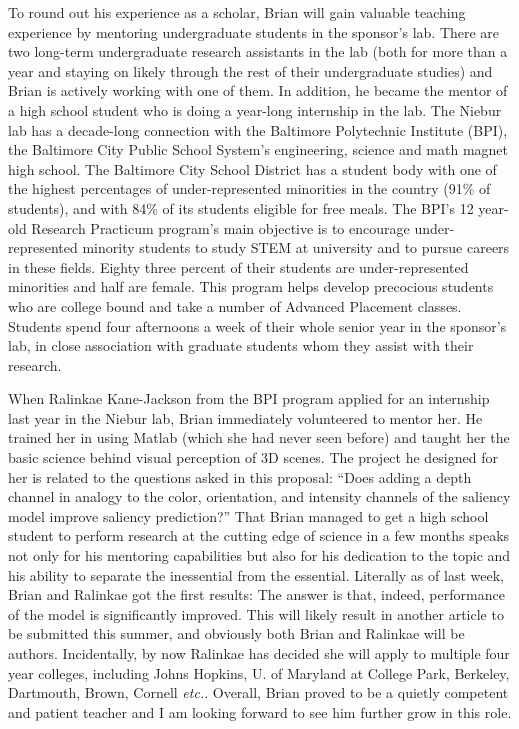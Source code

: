 \documentclass[11pt,notitlepage]{article}
\newcommand{\etc}[0]{{\em etc.}\xspace}
\begin{document}
To round out his experience as a scholar, Brian will gain
valuable teaching experience by
mentoring undergraduate
students in the sponsor's lab. There are two long-term undergraduate
research assistants in the lab (both for more than a year and staying
on likely through the rest of their undergraduate studies) and Brian
is actively working with one of them.  
In addition, he became the mentor of a high school student who is
doing a year-long internship in the lab. The Niebur lab has a
decade-long connection with the Baltimore Polytechnic Institute (BPI),
the Baltimore City Public School System's engineering, science and
math magnet high school. The Baltimore City School District has a
student body with one of the highest percentages of under-represented
minorities in the country (91\% of students), and with 84\% of its
students eligible for free meals.  The BPI's 12 year-old Research
Practicum program's main objective is to encourage under-represented
minority students to study STEM at university and to pursue careers in
these fields. Eighty three percent of their students are
under-represented minorities and half are female.  This program helps
develop precocious students who are college bound and take a number of
Advanced Placement classes.  Students spend four afternoons a week of
their whole senior year in the sponsor's lab, in close association
with graduate students whom they assist with their research.

When Ralinkae Kane-Jackson from the BPI program applied for an
internship last year in the Niebur lab, Brian immediately volunteered
to mentor her.  He trained her in using Matlab (which she had never
seen before) and taught her the basic science behind visual perception
of 3D scenes. The project he designed for her is related to the
questions asked in this proposal: ``Does adding a depth channel in
analogy to the color, orientation, and intensity channels of the
\citep{Itti_etal98a} saliency model improve saliency prediction?''
That Brian managed to get a high school student to perform research at
the cutting edge of science in a few months speaks not only for
his mentoring capabilities but also for his dedication to the topic
and his ability to separate the inessential from the
essential. Literally as of last week, Brian and Ralinkae got the first results:
The answer is that, indeed, performance of the model is significantly
improved. This will likely result in another article to be submitted
this summer, and obviously both Brian and Ralinkae will be authors. Incidentally, by now Ralinkae has decided she will apply to
multiple four year colleges, including Johns Hopkins, U. of Maryland
at College Park, Berkeley, Dartmouth, Brown, Cornell \etc. Overall, Brian proved to be a quietly competent and patient teacher
and I am looking forward to see him further grow in this role.
\end{document}
